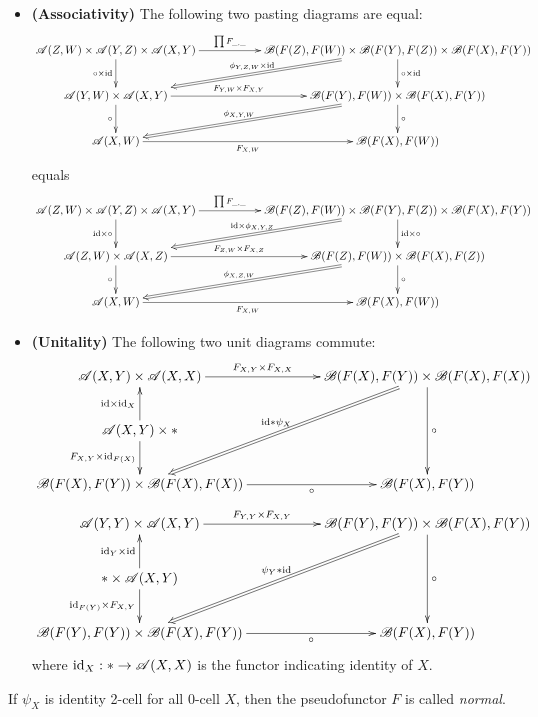 \documentclass{article}
\begin{document}
\begin{defn}[Pseudofunctor]
    \begin{itemize}
        \item[(i)] \textbf{(Associativity)} The following two pasting diagrams are equal:
        \begin{align*}
            \xymatrix{
                \A(Z,W)\times\A(Y,Z)\times\A(X,Y) \ar[d]_-{\circ\times\id} \ar[rr]^-{\prod F_{\_,\_}} && \B(F(Z),F(W))\times \B(F(Y),F(Z)) \times \B(F(X),F(Y)) \ar[d]^-{\circ\times \id} \ar@{=>}[dll]_-{\phi_{Y,Z,W}\times\id}\\
                \A(Y,W)\times\A(X,Y) \ar[d]_-{\circ} \ar[rr]^-{F_{Y,W}\times F_{X,Y}} && \B(F(Y),F(W))\times \B(F(X),F(Y)) \ar[d]^-{\circ} \ar@{=>}[dll]_-{\phi_{X,Y,W}}\\
                \A(X,W)\ar[rr]_-{F_{X,W}} && \B(F(X),F(W))
            }
        \end{align*}
        equals
        \begin{align*}
            \xymatrix{
                \A(Z,W)\times\A(Y,Z)\times\A(X,Y) \ar[d]_-{\id\times\circ} \ar[rr]^-{\prod F_{\_,\_}} && \B(F(Z),F(W))\times \B(F(Y),F(Z)) \times \B(F(X),F(Y)) \ar[d]^-{\id\times\circ} \ar@{=>}[dll]_-{\id\times\phi_{X,Y,Z}}\\
                \A(Z,W)\times\A(X,Z) \ar[d]_-{\circ} \ar[rr]^-{F_{Z,W}\times F_{X,Z}} && \B(F(Z),F(W))\times \B(F(X),F(Z)) \ar[d]^-{\circ} \ar@{=>}[dll]_-{\phi_{X,Z,W}}\\
                \A(X,W)\ar[rr]_-{F_{X,W}} && \B(F(X),F(W))
            }
        \end{align*}
        \item[(ii)] \textbf{(Unitality)} The following two unit diagrams commute:
        \begin{align*}
            \xymatrix{
                \A(X,Y)\times\A(X,X)\ar[rr]^-{F_{X,Y}\times F_{X,X}} && \B(F(X),F(Y))\times \B(F(X),F(X)) \ar[dd]^-{\circ} \ar@{=>}[ddll]_-{\id \mathrm{*}\psi_X}\\
                \A(X,Y)\times \mathrm{*} \ar[u]^-{\id\times \id_X} \ar[d]_-{F_{X,Y}\times \id_{F(X)}}\\
                \B(F(X),F(Y))\times \B(F(X),F(X)) \ar[rr]_-{\circ} && \B(F(X),F(Y))
            }
        \end{align*}
        \begin{align*}
            \xymatrix{
                \A(Y,Y)\times\A(X,Y)\ar[rr]^-{F_{Y,Y}\times F_{X,Y}} && \B(F(Y),F(Y))\times \B(F(X),F(Y)) \ar[dd]^-{\circ} \ar@{=>}[ddll]_-{\psi_Y\mathrm{*}\id}\\
                \mathrm{*}\times\A(X,Y) \ar[u]^-{\id_Y\times \id} \ar[d]_-{\id_{F(Y)}\times F_{X,Y}}\\
                \B(F(Y),F(Y))\times \B(F(X),F(Y)) \ar[rr]_-{\circ} && \B(F(X),F(Y))
            }
        \end{align*}
        where $\mathrm{id}_X:*\rightarrow\mathscr{A}(X,X)$ is the functor indicating identity of $X$.
    \end{itemize}

    If $\psi_X$ is identity 2-cell for all 0-cell $X$, then the pseudofunctor $F$ is called \emph{normal}.
\end{defn}
\end{document}
